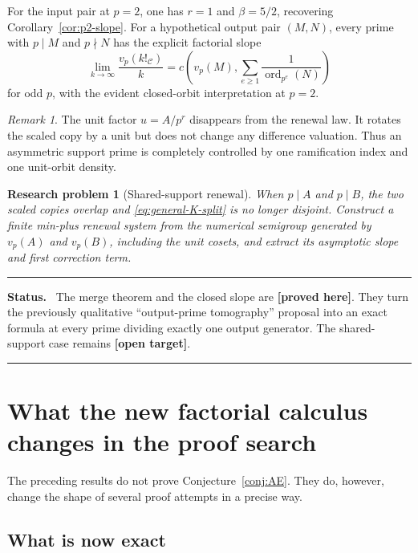 \documentclass[11pt,oneside]{article}
\newtheorem{problem}[theorem]{Research problem}
\theoremstyle{definition}
\theoremstyle{remark}
\newtheorem{remark}[theorem]{Remark}
\newcommand{\Cout}{\mathcal C}
\newcommand{\ord}{\operatorname{ord}}
\newcommand{\statusproved}{\textcolor{newgreen}{\textbf{[proved here]}}}
\newcommand{\statusopen}{\textcolor{openorange}{\textbf{[open target]}}}
\newenvironment{statusbox}
{\begin{center}\begin{minipage}{0.94\textwidth}\raggedright\hrule
\vspace{0.42em}\textbf{Status.}\ }
{\par\vspace{0.32em}\hrule\end{minipage}\end{center}}
\begin{document}
For the input pair at \(p=2\), one has \(r=1\) and \(\beta=5/2\), recovering
Corollary~\ref{cor:p2-slope}.  For a hypothetical output pair \((M,N)\), every prime with
\(p\mid M\) and \(p\nmid N\) has the explicit factorial slope
\begin{equation}
 \lim_{k\to\infty}\frac{v_p(k!_{\Cout})}{k}
 =c\!\left(v_p(M),\sum_{e\ge1}\frac1{\ord_{p^e}(N)}\right)
 \label{eq:output-asymmetric-slope}
\end{equation}
for odd \(p\), with the evident closed-orbit interpretation at \(p=2\).

\begin{remark}
The unit factor \(u=A/p^r\) disappears from the renewal law.  It rotates the scaled copy by a
unit but does not change any difference valuation.  Thus an asymmetric support prime is
completely controlled by one ramification index and one unit-orbit density.
\end{remark}

\begin{problem}[Shared-support renewal]
\label{prob:shared-support-renewal}
When \(p\mid A\) and \(p\mid B\), the two scaled copies overlap and
\eqref{eq:general-K-split} is no longer disjoint.  Construct a finite min-plus renewal system
from the numerical semigroup generated by \(v_p(A)\) and \(v_p(B)\), including the unit cosets,
and extract its asymptotic slope and first correction term.
\end{problem}

\begin{statusbox}
The merge theorem and the closed slope are \statusproved.  They turn the previously qualitative
``output-prime tomography'' proposal into an exact formula at every prime dividing exactly one
output generator.  The shared-support case remains \statusopen.
\end{statusbox}

\section{What the new factorial calculus changes in the proof search}
\label{sec:what-changes}

The preceding results do not prove Conjecture~\ref{conj:AE}.  They do, however, change the
shape of several proof attempts in a precise way.

\subsection{What is now exact}
\end{document}
